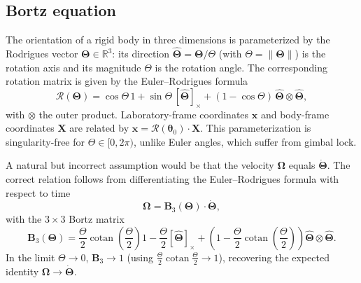 \documentclass[aps,prfluids,groupedaddress]{revtex4-2}
\newcommand{\bx}{\bm{x}}
\newcommand{\btheta}{\bm{\theta}}
\newcommand{\bX}{\bm{X}}
\newcommand{\bTheta}{\bm{\Theta}}
\newcommand{\bOmega}{\bm{\Omega}}
\newcommand{\tI}{\bm{\mathit{1}}}
\newcommand{\tB}{\bm{{B}}}
\newcommand{\bThetad}{\bm{\dot \Theta}}
\newcommand{\hTheta}{\bm{\hat \Theta}}
\newcommand{\mRot}{\bm{\mathcal{R}}}
\DeclareMathOperator{\cotan}{cotan}
\begin{document}
\subsection{Bortz equation\label{app:bortz}}

The orientation of a rigid body in three dimensions is parameterized by the Rodrigues vector $\bTheta\in\mathbb{R}^3$: its direction $\hTheta = \bTheta/\Theta$ (with $\Theta = \|\bTheta\|$) is the rotation axis and its magnitude $\Theta$ is the rotation angle. The corresponding rotation matrix is given by the Euler--Rodrigues formula
\begin{equation}\label{eq:Rodrigues_formula}
\mRot(\bTheta) = \cos\Theta\,\tI + \sin\Theta\,[\hTheta]_\times + (1-\cos\Theta)\,\hTheta\otimes\hTheta,
\end{equation}
with $\otimes$ the outer product.
Laboratory-frame coordinates $\bx$ and body-frame coordinates $\bX$ are related by $\bx = \mRot(\btheta_0)\cdot\bX$.
This parameterization is singularity-free for $\Theta\in[0,2\pi)$, unlike Euler angles, which suffer from gimbal lock.

A natural but incorrect assumption would be that the  velocity $\bOmega$ equals $\bThetad$. The correct relation follows from differentiating the Euler--Rodrigues formula with respect to time \cite{Bortz1971}\begin{equation}\label{eq.Bortz_kinematics}
\bOmega = \tB_3(\bTheta) \cdot \bThetad,
\end{equation}
with the $3\times 3$ Bortz matrix
\begin{equation}\label{eq.Bortz_one_sphere}
\tB_3(\bTheta) =
	\frac{\Theta}{2}\cotan\!\left(\frac{\Theta}{2}\right)\tI
	- \frac{\Theta}{2}\left[\hTheta\right]_\times
	+ \left(1 - \frac{\Theta}{2}\cotan\!\left(\frac{\Theta}{2}\right)\right)\hTheta\otimes\hTheta.
\end{equation}
In the limit $\Theta\to 0$, $\tB_3\to\tI$ (using $\frac{\Theta}{2}\cotan\frac{\Theta}{2}\to 1$), recovering the expected identity $\bOmega\to\bThetad$.
\end{document}
